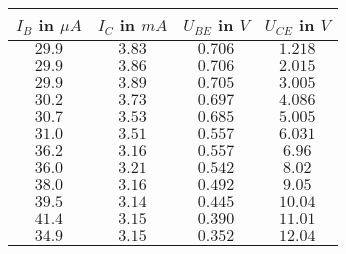 \begin{tabular}{c|c|c|c}
\(I_B\) in \(\mu A\) & \(I_C\) in \(mA\) & \(U_{BE}\) in \(V\) & \(U_{CE}\) in \(V\) \\ \hline
\(29.9\) & \(3.83\) & \(0.706\) & \(1.218\) \\ 
\(29.9\) & \(3.86\) & \(0.706\) & \(2.015\) \\ 
\(29.9\) & \(3.89\) & \(0.705\) & \(3.005\) \\ 
\(30.2\) & \(3.73\) & \(0.697\) & \(4.086\) \\ 
\(30.7\) & \(3.53\) & \(0.685\) & \(5.005\) \\ 
\(31.0\) & \(3.51\) & \(0.557\) & \(6.031\) \\ 
\(36.2\) & \(3.16\) & \(0.557\) & \(6.96\) \\ 
\(36.0\) & \(3.21\) & \(0.542\) & \(8.02\) \\ 
\(38.0\) & \(3.16\) & \(0.492\) & \(9.05\) \\ 
\(39.5\) & \(3.14\) & \(0.445\) & \(10.04\) \\ 
\(41.4\) & \(3.15\) & \(0.390\) & \(11.01\) \\ 
\(34.9\) & \(3.15\) & \(0.352\) & \(12.04\)
\end{tabular}